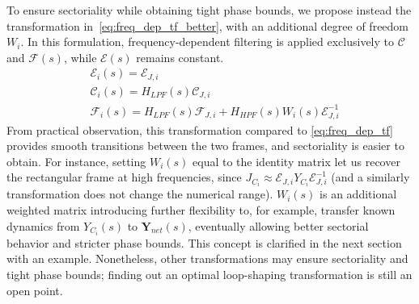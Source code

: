 To ensure sectoriality while obtaining tight phase bounds, we propose instead the transformation in~\eqref{eq:freq_dep_tf_better}, with an additional degree of freedom $W_i$. In this formulation, frequency-dependent filtering is applied exclusively to $\mathcal{C}$ and $\mathcal{F}(s)$, while $\mathcal{E}(s)$ remains constant.
\begin{equation}
\begin{aligned}
    &\mathcal{E}_i(s) = \mathcal{E}_{J,i} \\
    &\mathcal{C}_i(s) = H_{LPF}(s)\mathcal{C}_{J,i}\\
    &\mathcal{F}_i(s) = H_{LPF}(s)\mathcal{F}_{J,i}+H_{HPF}(s)W_i(s)\mathcal{E}_{J,i}^{-1}
\end{aligned}
\label{eq:freq_dep_tf_better}
\end{equation}
From practical observation, this transformation compared to \eqref{eq:freq_dep_tf} provides smooth transitions between the two frames, and sectoriality is easier to obtain.
For instance, setting $W_i(s)$ equal to the identity matrix
let us recover the rectangular frame at high frequencies, since $J_{C_i}\approx\mathcal{E}_{J,i}Y_{C_i}\mathcal{E}_{J,i}^{-1}$ (and a similarly transformation does not change the numerical range). $W_i(s)$ is an additional weighted matrix  introducing further flexibility to, for example, transfer known dynamics from $Y_{C_i}(s)$ to $\mathbf{Y}_{net}(s)$, eventually allowing better sectorial behavior and stricter phase bounds. This concept is clarified in the next section with an example. Nonetheless, other transformations may ensure sectoriality and tight phase bounds; finding out an optimal loop-shaping transformation is still an open point.